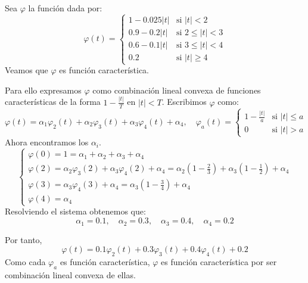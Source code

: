 \begin{exercise}
    Sea $\varphi$ la función dada por:
    $$\varphi(t) = \begin{cases}
            1 - 0.025|t| & \text{si } |t| < 2        \\
            0.9 - 0.2|t| & \text{si } 2 \leq |t| < 3 \\
            0.6 - 0.1|t| & \text{si } 3 \leq |t| < 4 \\
            0.2          & \text{si } |t| \geq 4
        \end{cases}$$
    Veamos que $\varphi$ es función característica.

    Para ello expresamos $\varphi$ como combinación lineal convexa de funciones características de la forma $1 - \frac{|t|}{T}$ en $|t| < T$.
    Escribimos $\varphi$ como:
    $$\varphi(t) = \alpha_1\varphi_2(t) + \alpha_2\varphi_3(t) + \alpha_3\varphi_4(t) + \alpha_4, \quad \varphi_a(t) = \begin{cases}
            1 - \frac{|t|}{a} & \text{si } |t| \leq a \\
            0                 & \text{si } |t| > a
        \end{cases}$$
    Ahora encontramos los $\alpha_i$.
    $$\begin{cases}
            \varphi(0) = 1 = \alpha_1 + \alpha_2 + \alpha_3 + \alpha_4                                                                                               \\
            \varphi(2) = \alpha_2\varphi_3(2) + \alpha_3\varphi_4(2) + \alpha_4 = \alpha_2\left(1-\frac{2}{3}\right) + \alpha_3\left(1-\frac{1}{2}\right) + \alpha_4 \\
            \varphi(3) = \alpha_3\varphi_4(3) + \alpha_4 = \alpha_3\left(1-\frac{3}{4}\right) + \alpha_4                                                             \\
            \varphi(4) = \alpha_4
        \end{cases}$$
    Resolviendo el sistema obtenemos que:
    $$\alpha_1 = 0.1, \quad \alpha_2 = 0.3, \quad \alpha_3 = 0.4, \quad \alpha_4 = 0.2$$

    Por tanto,
    $$\varphi(t) = 0.1\varphi_2(t) + 0.3\varphi_3(t) + 0.4\varphi_4(t) + 0.2$$
    Como cada $\varphi_a$ es función característica, $\varphi$ es función característica por ser combinación lineal convexa de ellas.
\end{exercise}
